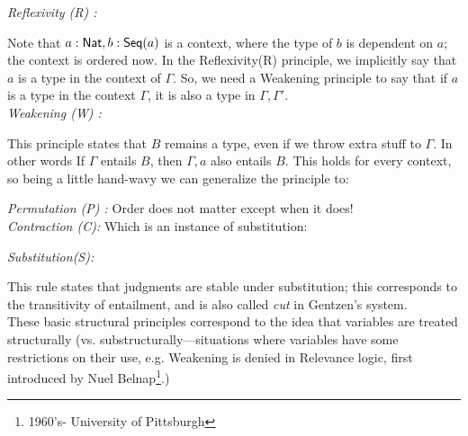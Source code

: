 \documentclass{article}
\begin{document}
{\it Reflexivity (R) :}
\begin{mathpar}
 \end{mathpar}
Note that $a:\tNat, b:\mathsf{Seq}(a)$ is a context, where the type of $b$ is dependent on $a$; the context is ordered now. In the Reflexivity(R) principle, we implicitly say that $a$ is a type in the context of $\Gamma$. So, we need a Weakening principle to say that if $a$ is a type in the context $\Gamma$, it is also a type in $\Gamma, \Gamma'$. \\
 {\it Weakening (W) :}
  \begin{mathpar}
  \end{mathpar}
    This principle states that $B$ remains a type, even if we throw extra stuff to $\Gamma$. In other words If $\Gamma $ entails $B$, then $\Gamma, a $ also entails $B$. This holds for every context, so being a little hand-wavy we can generalize the principle to:
  \begin{mathpar}
\end{mathpar}
{\it Permutation (P) :} Order does not matter except when it does! \\
{\it Contraction (C):} Which is an instance of substitution: 
\begin{mathpar}
\end{mathpar}
{\it Substitution(S):} 
\begin{mathpar}
\end{mathpar}
This rule states that judgments are stable under substitution; this corresponds to the transitivity of entailment, and is also called {\it cut} in Gentzen's system. \\
These basic structural principles correspond to the idea that variables are treated structurally (vs. substructurally---situations where variables have some restrictions on their use, e.g. Weakening is denied in Relevance logic, first introduced by Nuel Belnap\footnote{1960's- University of Pittsburgh}.)\\
\end{document}
